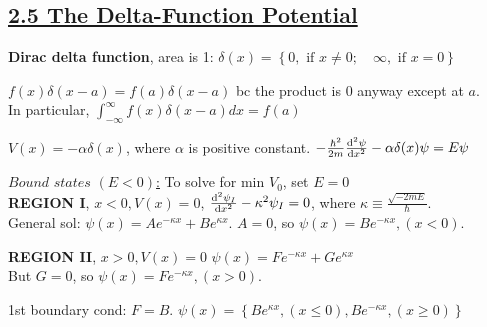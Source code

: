 

\subsection{\underline{2.5 The Delta-Function Potential}}

\textbf{Dirac delta function}, area is 1:
$\delta(x) = \left\{ 0, \textrm { if } x \neq 0; \quad \infty, \textrm{ if } x = 0 \right\}$

$f(x) \delta(x - a) = f(a) \delta(x - a)$ bc the product is 0 anyway except at $a$. \\

In particular, $\int_{-\infty}^{\infty} f(x) \delta(x-a) dx = f(a)$

$V(x) = -\alpha \delta(x)$, where $\alpha$ is positive constant. $-\frac{\hbar^2}{2m} \dv[2]{\psi}{x} - \alpha \delta(x) \psi = E \psi$

\underline{$\textit{Bound states } (E < 0)$:} To solve for min $V_0$, set $E=0$ \\

\textbf{REGION I}, $x < 0, V(x) = 0$, 
$\dv[2]{\psi_{I}}{x} - \kappa^2 \psi_{I} = 0$, where $\kappa \equiv \frac{\sqrt{-2mE}}{\hbar}$. \\

General sol: $\psi(x) = Ae^{-\kappa x} + Be^{\kappa x}$.
$A = 0$, so $\psi(x) = Be^{-\kappa x}, (x < 0)$.

\textbf{REGION II}, $x > 0, V(x) = 0$
$\psi(x) = Fe^{-\kappa x} + Ge^{\kappa x}$ \\
But $G = 0$, so $\psi(x) = Fe^{-\kappa x}, (x > 0)$.

1st boundary cond: $F=B$.
$\psi(x) = \left\{ Be^{\kappa x}, (x \leq 0), Be^{-\kappa x}, (x \geq 0) \right\}$


